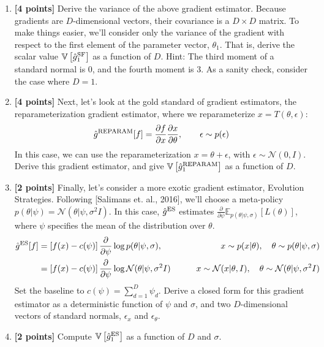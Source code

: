 \documentclass{harvardml}
\newcommand{\distNorm}{\mathcal{N}}
\newcommand{\var}{\mathbb{V}}
\newcommand{\E}{\mathbb{E}}
\theoremstyle{plain}
\begin{document}
\begin{problem}
\begin{enumerate}[label=(\alph*)]
\item {\bf [4 points]} Derive the variance of the above gradient estimator.
Because gradients are $D$-dimensional vectors, their covariance is a $D \times D$ matrix.
To make things easier, we'll consider only the variance of the gradient with respect to the first element of the parameter vector, $\theta_1$.
That is, derive the scalar value $\var \left[ \hat g^\textnormal{SF}_1 \right]$ as a function of $D$.
Hint: The third moment of a standard normal is 0, and the fourth moment is 3.
As a sanity check, consider the case where $D = 1$.

\item {\bf [4 points]} Next, let's look at the gold standard of gradient estimators, the reparameterization gradient estimator, where we reparameterize $x = T(\theta, \epsilon)$:
%
\begin{align}
\hat g^\textnormal{REPARAM}[f] = \frac{\partial f}{\partial x} \frac{\partial x}{\partial \theta}, \qquad \epsilon \sim p(\epsilon)
\end{align}
%
In this case, we can use the reparameterization $x = \theta + \epsilon$, with $\epsilon \sim \distNorm(0, I)$.
%
Derive this gradient estimator, and give $\var \left[ \hat g^\textnormal{REPARAM}_1 \right]$ as a function of $D$.

\item {\bf [2 points]} Finally, let's consider a more exotic gradient estimator, Evolution Strategies.
Following [Salimans et. al., 2016], we'll choose a meta-policy $p(\theta | \psi) = \distNorm(\theta | \psi, \sigma^2 I)$.
In this case, $\hat g^\textnormal{ES}$ estimates $\frac{\partial}{\partial \psi}\E_{p(\theta|\psi, \sigma)}\left[ L(\theta) \right]$, where $\psi$ specifies the mean of the distribution over $\theta$.
%
\begin{align}
\hat g^\textnormal{ES}[f]
& = \left[f(x) - c(\psi)\right] \frac{\partial}{\partial \psi} \log p(\theta | \psi, \sigma), 
& \qquad x \sim p(x | \theta),\quad \theta \sim p(\theta | \psi, \sigma) \\
& = \left[f(x) - c(\psi)\right] \frac{\partial}{\partial \psi} \log \distNorm(\theta | \psi, \sigma^2 I)
& \qquad x \sim \distNorm(x | \theta, I), \quad \theta \sim \distNorm(\theta | \psi, \sigma^2 I)
\end{align}
%
Set the baseline to $c(\psi) = \sum_{d=1}^D \psi_d$.
Derive a closed form for this gradient estimator as a deterministic function of $\psi$ and $\sigma$, and two $D$-dimensional vectors of standard normals, $\epsilon_x$ and $\epsilon_\theta$.

\item {\bf [2 points]} Compute $\var \left[ \hat g^\textnormal{ES}_1 \right]$ as a function of $D$ and $\sigma$.
\end{enumerate}
\end{problem}
\end{document}
